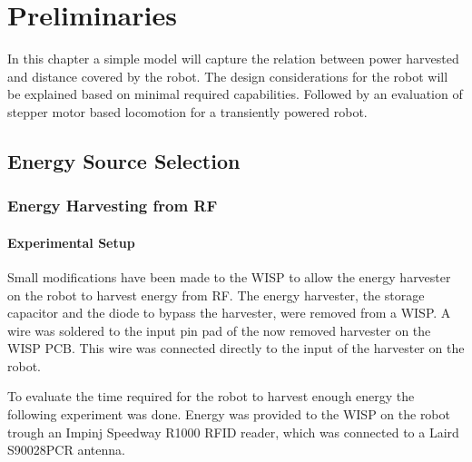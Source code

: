\chapter{Preliminaries}

In this chapter a simple model will capture the relation between power harvested and distance covered by the robot.
The design considerations for the robot will be explained based on minimal required capabilities. 
Followed by an evaluation of stepper motor based locomotion for a transiently powered robot.



\section{Energy Source Selection}

\subsection{Energy Harvesting from RF}


\subsubsection{Experimental Setup}

Small modifications have been made to the WISP to allow the energy harvester on the robot to harvest energy from RF.
The energy harvester, the storage capacitor and the diode to bypass the harvester, were removed from a WISP.
A wire was soldered to the input pin pad of the now removed harvester on the WISP PCB.
This wire was connected directly to the input of the harvester on the robot.

To evaluate the time required for the robot to harvest enough energy the following experiment was done.
Energy was provided to the WISP on the robot trough an Impinj Speedway R1000 RFID reader, which was connected to a Laird S90028PCR antenna.

